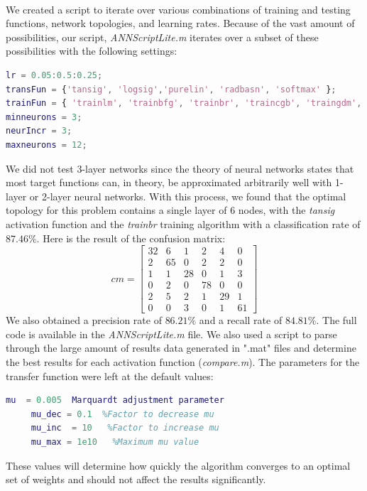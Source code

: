 \documentclass[a4paper,12pt,oneside,final]{report}
\newenvironment{changemargin}[2]{\begin{list}{}{%
\setlength{\topsep}{0pt}%
\setlength{\leftmargin}{0pt}%
\setlength{\rightmargin}{0pt}%
\setlength{\listparindent}{\parindent}%
\setlength{\itemindent}{\parindent}%
\setlength{\parsep}{0pt plus 1pt}%
\addtolength{\leftmargin}{#1}%
\addtolength{\rightmargin}{#2}%
}\item }{\end{list}}
\begin{document}
\paragraph{}
We created a script to iterate over various combinations of training and testing functions, network topologies, and learning rates.  Because of the vast amount of possibilities, our script, \textit{ANNScriptLite.m} iterates over a subset of these possibilities with the following settings:
\begin{changemargin}{-5mm}{-5mm}
\begin{lstlisting}[language=Matlab, frame=single]
lr = 0.05:0.5:0.25;
transFun = {'tansig', 'logsig','purelin', 'radbasn', 'softmax' };
trainFun = { 'trainlm', 'trainbfg', 'trainbr', 'traincgb', 'traingdm', 'traingdx', 'trainscg'};
minneurons = 3;
neurIncr = 3;
maxneurons = 12;
\end{lstlisting}
\end{changemargin}
We did not test 3-layer networks since the theory of neural networks states that most target functions can, in theory, be approximated arbitrarily well with 1-layer or 2-layer neural networks.  With this process, we found that the optimal topology for this problem contains a single layer of 6 nodes, with the \emph{tansig} activation function and the \emph{trainbr} training algorithm with a classification rate of $87.46\%$.  Here is the result of the confusion matrix:
\[
cm = \left[\begin{array}{cccccc}
32   &  6   &  1   &  2    & 4 &    0 \\
     2&    65  &   0  &   2   &  2  &   0 \\
     1   &  1    &28    & 0    & 1  &   3 \\
     0   &  2     &0    &78    & 0   &  0 \\
     2    & 5     &2   &  1   & 29   &  1 \\
     0     &0     &3   &  0   &  1  &  61
\end{array}
\right]
\]
We also obtained a precision rate of $86.21\%$ and a recall rate of $84.81\%$.
The full code is available in the \textit{ANNScriptLite.m} file.  We also used a script to parse through the large amount of results data generated in ".mat" files and determine the best results for each activation function (\textit{compare.m}).  The parameters for the transfer function were left at the default values:
\begin{changemargin}{-5mm}{-5mm}
\begin{lstlisting}[language=Matlab, frame=single]		
     mu  = 0.005  Marquardt adjustment parameter
     mu_dec = 0.1  %Factor to decrease mu
     mu_inc  = 10   %Factor to increase mu
     mu_max = 1e10   %Maximum mu value
\end{lstlisting}
\end{changemargin}
These values will determine how quickly the algorithm converges to an optimal set of weights and should not affect the results significantly.
\end{document}
